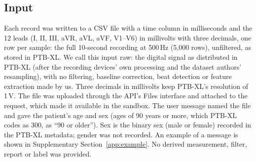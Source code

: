 \subsection{Input}
Each record was written to a CSV file with a time column in milliseconds and the 12 leads (I, II, III, aVR, aVL, aVF,
V1--V6) in millivolts with three decimals, one row per sample: the full 10-second recording at 500\,Hz (5{,}000 rows),
unfiltered, as stored in PTB-XL. We call this input raw: the digital signal as distributed in PTB-XL (after the
recording devices' own processing and the dataset authors' resampling), with no filtering, baseline correction, beat
detection or feature extraction made by us. Three decimals in millivolts keep PTB-XL's resolution of 1\,\textmu V. The file was uploaded through the API's Files interface and attached to the request,
which made it available in the sandbox. The user message named the file and gave the patient's age and sex (ages of 90
years or more, which PTB-XL codes as 300, as ``90 or older''). Sex is the binary sex (male or female) recorded in the
PTB-XL metadata; gender was not recorded. An example of a message is shown in Supplementary Section~\ref{app:example}. No derived measurement, filter, report or label was provided.

